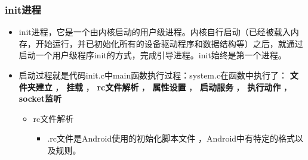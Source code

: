 \documentclass[9pt, b5paper]{article}
\begin{document}
\subsubsection{init进程}
\label{sec-5-0-3}
\begin{itemize}
\item init进程，它是一个由内核启动的用户级进程。内核自行启动（已经被载入内存，开始运行，并已初始化所有的设备驱动程序和数据结构等）之后，就通过启动一个用户级程序init的方式，完成引导进程。init始终是第一个进程。
\item 启动过程就是代码init.c中main函数执行过程：system\core\init\init.c在函数中执行了： \textbf{文件夹建立} ， \textbf{挂载} ， \textbf{rc文件解析} ， \textbf{属性设置} ， \textbf{启动服务} ， \textbf{执行动作} ， \textbf{socket监听} 
\begin{itemize}
\item rc文件解析
\begin{itemize}
\item .rc文件是Android使用的初始化脚本文件 ，Android中有特定的格式以及规则。
\end{itemize}
\end{itemize}
\end{itemize}
\end{document}
